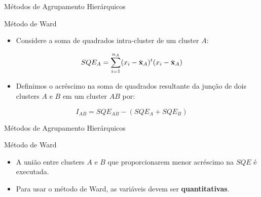 \documentclass[
  ignorenonframetext,
  aspectratio=169,
]{beamer}
\providecommand{\tightlist}{%
  \setlength{\itemsep}{0pt}\setlength{\parskip}{0pt}}
\begin{document}
\begin{frame}{Métodos de Agrupamento Hierárquicos}
\protect{}\label{muxe9todos-de-agrupamento-hieruxe1rquicos-9}
\begin{block}{Método de Ward}
\protect{}\label{muxe9todo-de-ward}
\begin{itemize}
\tightlist
\item
  Considere a soma de quadrados intra-cluster de um cluster \(A\):
\end{itemize}

\[SQE_A = \displaystyle{\sum_{i = 1}^{n_A}}(x_{i} - \bar{\bf x}_A)^t(x_{i} - \bar{\bf x}_A)\]

\begin{itemize}
\tightlist
\item
  Definimos o acréscimo na soma de quadrados resultante da junção de
  dois clusters \(A\) e \(B\) em um cluster \(AB\) por:
\end{itemize}

\[I_{AB} = SQE_{AB} - (SQE_A + SQE_B)\]
\end{block}
\end{frame}

\begin{frame}{Métodos de Agrupamento Hierárquicos}
\protect{}\label{muxe9todos-de-agrupamento-hieruxe1rquicos-10}
\begin{block}{Método de Ward}
\protect{}\label{muxe9todo-de-ward-1}
\begin{itemize}
\item
  A união entre clusters \(A\) e \(B\) que proporcionarem menor
  acréscimo na \(SQE\) é executada.
\item
  Para usar o método de Ward, as variáveis devem ser
  \textbf{quantitativas}.
\end{itemize}
\end{block}
\end{frame}
\end{document}
